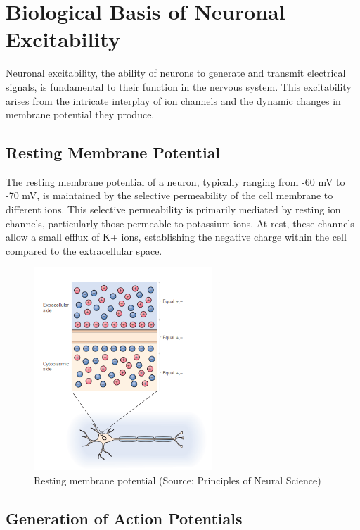 \documentclass[12pt,a4paper]{report}
\begin{document}
\section{Biological Basis of Neuronal Excitability}

Neuronal excitability, the ability of neurons to generate and transmit electrical signals, is fundamental to their function in the nervous system. This excitability arises from the intricate interplay of ion channels and the dynamic changes in membrane potential they produce.

\subsection{Resting Membrane Potential}

The resting membrane potential of a neuron, typically ranging from -60 mV to -70 mV, is maintained by the selective permeability of the cell membrane to different ions. This selective permeability is primarily mediated by resting ion channels, particularly those permeable to potassium ions. At rest, these channels allow a small efflux of K+ ions, establishing the negative charge within the cell compared to the extracellular space.

\begin{figure}[htbp]
    \centering
    \includegraphics[width=0.6\textwidth]{./data/resting_membrane_potential.png}
    \caption{Resting membrane potential (Source: Principles of Neural Science\cite{principles_of_neural_science})}
    \label{fig:resting_membrane_potential}
\end{figure}

\subsection{Generation of Action Potentials}
\end{document}
